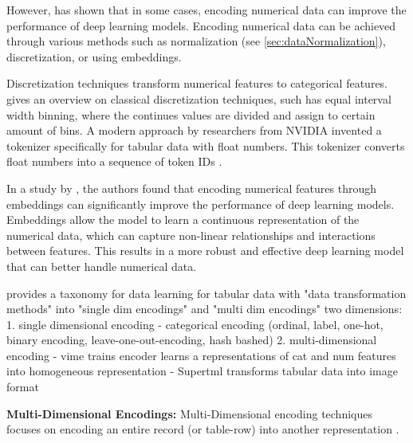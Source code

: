 However, \cite{gorishniy2022EmbeddingsNumericalFeatures} has shown that in some cases, encoding numerical data can improve the performance of deep learning models. 
Encoding numerical data can be achieved through various methods such as normalization (see \autoref{sec:dataNormalization}), discretization, or using embeddings.

Discretization techniques transform numerical features to categorical features. 
\cite{dougherty1995SupervisedUnsupervisedDiscretization} gives an overview on classical discretization techniques, such has equal interval width binning, where the continues values are divided and assign to certain amount of bins.
A modern approach by researchers from NVIDIA \cite{dong2022GeneratingSyntheticData} invented a tokenizer specifically for tabular data with float numbers. 
This tokenizer converts float numbers into a sequence of token IDs \cite{dong2022GeneratingSyntheticData}.

In a study by \cite{gorishniy2022EmbeddingsNumericalFeatures}, the authors found that encoding numerical features through embeddings can significantly improve the performance of deep learning models. 
Embeddings allow the model to learn a continuous representation of the numerical data, which can capture non-linear relationships and interactions between features. 
This results in a more robust and effective deep learning model that can better handle numerical data.


\cite{borisov2022DeepNeuralNetworks} provides a taxonomy for data learning for tabular data with "data transformation methods" into "single dim encodings" and "multi dim encodings" 
two dimensions:\cite{borisov2022DeepNeuralNetworks}
    1. single dimensional encoding
        - categorical encoding (ordinal, label, one-hot, binary encoding, leave-one-out-encoding, hash bashed) %
    2. multi-dimensional encoding 
        - vime trains encoder learns a representations of cat and num features into homogeneous representation
        - Supertml transforms tabular data into image format

\textbf{Multi-Dimensional Encodings:}
Multi-Dimensional encoding techniques focuses on encoding an entire record (or table-row) into another representation \cite{borisov2022DeepNeuralNetworks}.


\label{sec:dataNormalization} 

